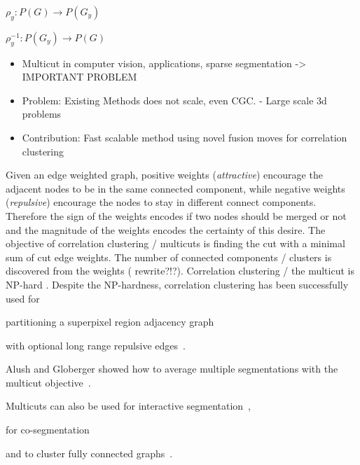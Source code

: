 \documentclass[10pt,twocolumn,letterpaper]{article}
\begin{document}

$\rho_y : P(G) \to P(G_y)$


$\rho_y^{-1} : P(G_y) \to P(G)$
\begin{itemize}
  \item Multicut in computer vision, applications, sparse segmentation -> IMPORTANT PROBLEM
  \item Problem: Existing Methods does not scale, even CGC. - Large scale 3d problems
  \item Contribution: Fast scalable method using novel fusion moves for correlation clustering
\end{itemize}





Given an edge weighted graph, positive weights (\emph{attractive})
encourage the adjacent nodes to be in the same 
connected component, while negative weights (\emph{repulsive}) encourage
the nodes to stay in different connect components.
Therefore the sign of the weights encodes if two
nodes should be merged or not and the magnitude of the weights encodes
the certainty of this desire.
The objective of correlation clustering / multicuts
is finding the cut with a minimal sum of cut edge weights.
The number of connected components / clusters is discovered
from the weights ( rewrite?!?).
Correlation clustering / the multicut is NP-hard \cite{???}.
%
Despite the NP-hardness, correlation clustering has been 
successfully used for
\begin{inparaenum}[(i)]
    \item partitioning a superpixel region adjacency graph~\cite{andres_2011_iccv,kroeger_2012_eccv}
    \item with optional long range repulsive edges~\cite{andres_2013_emmcvpr}.
    \item Alush and Globerger showed how to average multiple segmentations with the multicut objective~\cite{alush_2012_pami}.
    \item Multicuts can also be used for interactive segmentation~\cite{bagon_2011_arxiv},
    \item for co-segmentation~\cite{glassner_2011_cvpr}
    \item and to cluster fully connected graphs~\cite{???}.
\end{inparaenum}
\end{document}
